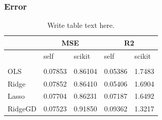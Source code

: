 \begin{figure} [H]%
	\centering
	\caption{}%
	\label{fig:R2_scores}
\end{figure}

\subsubsection{Error}

\begin{table} [H]
	\caption{Write table text here.  \vspace{2mm}}
	\begin{tabularx}{\textwidth}{l|XX|XX} \hline\hline
		\label{tab:franke_error}
		& \multicolumn{2}{c}{\textbf{MSE}}&\multicolumn{2}{c}{\textbf{R2}}\\ \hline
		&self&scikit&self&scikit\\ \hline \\
		OLS & 0.07853 & 0.86104 & 0.05386 & 1.7483\\
		Ridge & 0.07852 & 0.86410 & 0.05406 & 1.6904 \\
		Lasso & 0.07704 & 0.86231 & 0.07187 & 1.6492 \\
		RidgeGD & 0.07523 & 0.91850 & 0.09362 & 1.3217 \\ \hline
	\end{tabularx}
\end{table}


